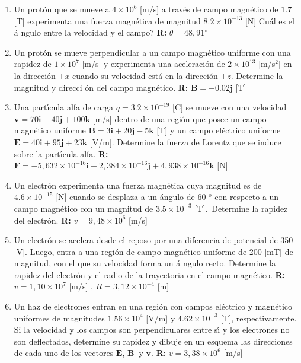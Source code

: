 \documentclass[12pt]{article}
\begin{document}
\begin{enumerate}
\item Un prot\'{o}n que se mueve a $4\times 10^{6}$ [m/s] a trav\'{e}s de
campo magn\'{e}tico de $1.7$ [T] experimenta una fuerza magn\'{e}tica de
magnitud $8.2\times 10^{-13}$ [N] \textquestiondown Cu\'{a}l es el \'{a}%
ngulo entre la velocidad y el campo? \textbf{R:} $\theta =48,91%
{{}^\circ}%
$

\item Un prot\'{o}n se mueve perpendicular a un campo magn\'{e}tico uniforme
con una rapidez de $1\times 10^{7}$ [m/s] y experimenta una aceleraci\'{o}n
de $2\times 10^{13}$ [m/s$^{2}$] en la direcci\'{o}n $+x$ cuando su
velocidad est\'{a} en la direcci\'{o}n $+z$. Determine la magnitud y direcci%
\'{o}n del campo magn\'{e}tico. \textbf{R: }$\mathbf{B}=-0.02\mathbf{j}$ [T]

\item Una part\'{\i}cula alfa de carga $q=3.2\times 10^{-19}$ [C] se mueve
con una velocidad $\mathbf{v}=70\mathbf{i}-40\mathbf{j}+100\mathbf{k}$ [m/s]
dentro de una regi\'{o}n que posee un campo magn\'{e}tico uniforme $\mathbf{B%
}=3\mathbf{i}+20\mathbf{j}-5\mathbf{k}$ [T] y un campo el\'{e}ctrico
uniforme $\mathbf{E}=40\mathbf{i}+95\mathbf{j}+23\mathbf{k}$ [V/m].
Determine la fuerza de Lorentz que se induce sobre la part\'{\i}cula alfa. 
\textbf{R: }$\mathbf{F}=-5,632\times 10^{-16}\mathbf{i}+2,384\times 10^{-16}%
\mathbf{j}+4,938\times 10^{-16}\mathbf{k}$ [N]

\item Un electr\'{o}n experimenta una fuerza magn\'{e}tica cuya magnitud es
de $4.6\times 10^{-15}$ [N] cuando se desplaza a un \'{a}ngulo de 60%
${{}^o}$
con respecto a un campo magn\'{e}tico con un magnitud de $3.5\times 10^{-3}$
[T].\ Determine la rapidez del electr\'{o}n. \textbf{R: }$v=9,48\times
10^{6} $ [m/s]

\item Un electr\'{o}n se acelera desde el reposo por una diferencia de
potencial de 350 [V]. Luego, entra a una regi\'{o}n de campo magn\'{e}tico
uniforme de 200 [mT] de magnitud, con el que su velocidad forma un \'{a}%
ngulo recto. Determine la rapidez del electr\'{o}n y el radio de la
trayectoria en el campo magn\'{e}tico. \textbf{R: }$v=1,10\times 10^{7}$
[m/s] , $R=3,12\times 10^{-4}$ [m]

\item Un haz de electrones entran en una regi\'{o}n con campos el\'{e}ctrico
y magn\'{e}tico uniformes de magnitudes $1.56\times 10^{4}$ [V/m] y $%
4.62\times 10^{-3}$ [T], respectivamente. Si la velocidad y los campos son
perpendiculares entre s\'{\i} y los electrones no son deflectados, determine
su rapidez y dibuje en un esquema las direcciones de cada uno de los
vectores $\mathbf{E}$, $\mathbf{B}$\textbf{\ }y $\mathbf{v}$. \textbf{R: }$%
v=3,38\times 10^{6}$ [m/s]


\end{enumerate}
\end{document}
